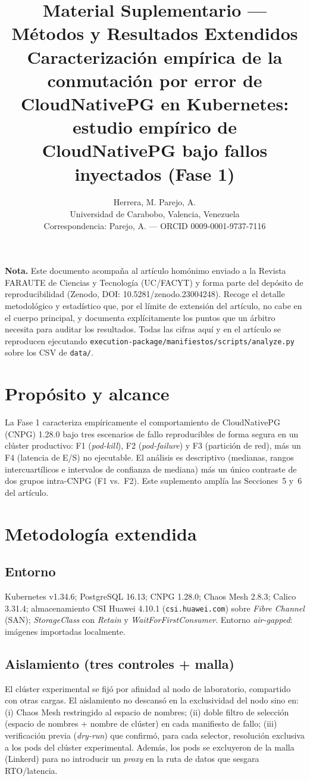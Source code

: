 \documentclass[11pt,letterpaper]{article}
\title{\bfseries Material Suplementario --- Métodos y Resultados Extendidos\\[4pt]
\large Caracterización empírica de la conmutación por error de CloudNativePG en Kubernetes:\\
estudio empírico de CloudNativePG bajo fallos inyectados (Fase 1)}
\author{Herrera, M. \quad Parejo, A.\\ \small Universidad de Carabobo, Valencia, Venezuela\\ \small Correspondencia: Parejo, A. --- ORCID 0009-0001-9737-7116}
\date{}
\begin{document}
\maketitle

\noindent\textbf{Nota.} Este documento acompaña al artículo homónimo enviado a la Revista FARAUTE de Ciencias y Tecnología (UC/FACYT) y forma parte del depósito de reproducibilidad (Zenodo, DOI: 10.5281/\allowbreak zenodo.23004248). Recoge el detalle metodológico y estadístico que, por el límite de extensión del artículo, no cabe en el cuerpo principal, y documenta explícitamente los puntos que un árbitro necesita para auditar los resultados. Todas las cifras aquí y en el artículo se reproducen ejecutando \texttt{execution-package/\allowbreak manifiestos/\allowbreak scripts/\allowbreak analyze.py} sobre los CSV de \texttt{data/}.

\section{Propósito y alcance}
La Fase 1 caracteriza empíricamente el comportamiento de CloudNativePG (CNPG) 1.28.0 bajo tres escenarios de fallo reproducibles de forma segura en un clúster productivo: F1 (\emph{pod-kill}), F2 (\emph{pod-failure}) y F3 (partición de red), más un F4 (latencia de E/S) no ejecutable. El análisis es descriptivo (medianas, rangos intercuartílicos e intervalos de confianza de mediana) más un único contraste de dos grupos intra-CNPG (F1 vs.\ F2). Este suplemento amplía las Secciones~5 y~6 del artículo.

\section{Metodología extendida}
\subsection{Entorno}
Kubernetes v1.34.6; PostgreSQL 16.13; CNPG 1.28.0; Chaos Mesh 2.8.3; Calico 3.31.4; almacenamiento CSI Huawei 4.10.1 (\texttt{csi.huawei.com}) sobre \emph{Fibre Channel} (SAN); \emph{StorageClass} con \emph{Retain} y \emph{WaitForFirstConsumer}. Entorno \emph{air-gapped}: imágenes importadas localmente.

\subsection{Aislamiento (tres controles + malla)}
El clúster experimental se fijó por afinidad al nodo de laboratorio, compartido con otras cargas. El aislamiento no descansó en la exclusividad del nodo sino en: (i) Chaos Mesh restringido al espacio de nombres; (ii) doble filtro de selección (espacio de nombres + nombre de clúster) en cada manifiesto de fallo; (iii) verificación previa (\emph{dry-run}) que confirmó, para cada selector, resolución exclusiva a los pods del clúster experimental. Además, los pods se excluyeron de la malla (Linkerd) para no introducir un \emph{proxy} en la ruta de datos que sesgara RTO/latencia.
\end{document}
